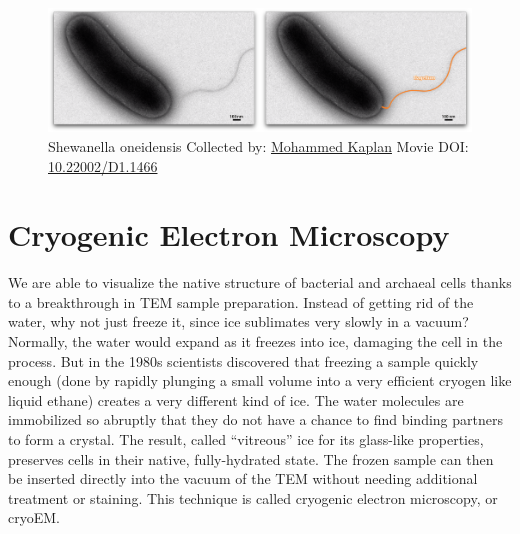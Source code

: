 \documentclass[]{tufte-book}
\begin{document}
\begin{figure}
\includegraphics{movie_stills/1_4} \caption[Shewanella oneidensis Collected by:
\protect\hyperlink{mohammed_kaplan}{Mohammed Kaplan} Movie DOI:
\href{https://doi.org/10.22002/D1.1466}{10.22002/D1.1466}]{Shewanella oneidensis Collected by:
\protect\hyperlink{mohammed_kaplan}{Mohammed Kaplan} Movie DOI:
\href{https://doi.org/10.22002/D1.1466}{10.22002/D1.1466}}\label{fig:1-4}
\end{figure}

\section{Cryogenic Electron
Microscopy}\label{cryogenic-electron-microscopy}

We are able to visualize the native structure of bacterial and archaeal
cells thanks to a breakthrough in TEM sample preparation. Instead of
getting rid of the water, why not just freeze it, since ice sublimates
very slowly in a vacuum? Normally, the water would expand as it freezes
into ice, damaging the cell in the process. But in the 1980s scientists
discovered that freezing a sample quickly enough (done by rapidly
plunging a small volume into a very efficient cryogen like liquid
ethane) creates a very different kind of ice. The water molecules are
immobilized so abruptly that they do not have a chance to find binding
partners to form a crystal. The result, called ``vitreous'' ice for its
glass-like properties, preserves cells in their native, fully-hydrated
state. The frozen sample can then be inserted directly into the vacuum
of the TEM without needing additional treatment or staining. This
technique is called cryogenic electron microscopy, or cryoEM.
\end{document}

